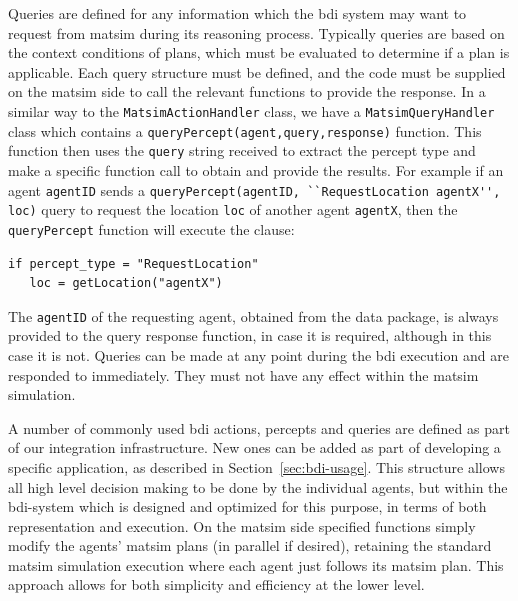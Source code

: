 Queries are defined for any information which the \gls{bdi} system may want
to request from \gls{matsim} during its reasoning process. Typically queries
are based on the context conditions of plans, which must be evaluated
to determine if a plan is applicable. Each query structure must be
defined, and the code must be supplied on the \gls{matsim} side to call the
relevant functions to provide the response. 
In a similar way to the \lstinline{MatsimActionHandler} class, we have a
\lstinline{MatsimQueryHandler} 
class which contains a \lstinline{queryPercept(agent,query,response)}
function.
This function then uses the \lstinline{query} string received to extract the
percept type and make a specific function call to obtain and provide the
results. For example if an agent \lstinline{agentID} sends a
\lstinline{queryPercept(agentID, ``RequestLocation agentX'', loc)} query to
request the location \lstinline{loc} of another agent \lstinline{agentX}, then the
\lstinline{queryPercept} 
function will execute the clause:
\begin{lstlisting}
if percept_type = "RequestLocation"
   loc = getLocation("agentX")
\end{lstlisting}
The \lstinline{agentID} of
the requesting agent, obtained from the data package, is always
provided to the query response function, in case it is required, 
although in this case it is not.
Queries can be made at any point
during the \gls{bdi} execution and are responded to immediately. They must
not have any effect within the \gls{matsim} simulation.

A number of commonly used \gls{bdi} actions, percepts and queries are
defined as part of our integration infrastructure. New ones can be
added as part of developing a specific application, as described in
Section~\ref{sec:bdi-usage}.
%
This structure allows all high level decision making to be done by the
individual agents, but within the \gls{bdi}-system which is designed and
optimized for this purpose, in terms of both representation and
execution. On the \gls{matsim} side specified functions simply modify the
agents' \gls{matsim} plans (in parallel if desired), retaining the standard
\gls{matsim} simulation execution where each agent just follows its \gls{matsim}
plan.  This approach allows for both simplicity and efficiency at the
lower level.

